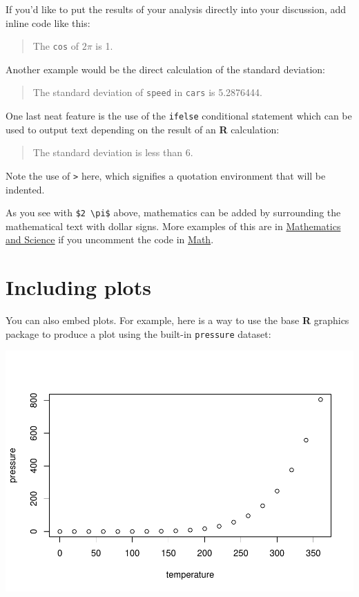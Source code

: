 \documentclass [11pt, proquest] {uwthesis}[2015/03/03]
\begin{document}
If you'd like to put the results of your analysis directly into your discussion, add inline code like this:
\begin{quote}
The \texttt{cos} of \(2 \pi\) is 1.
\end{quote}
Another example would be the direct calculation of the standard deviation:
\begin{quote}
The standard deviation of \texttt{speed} in \texttt{cars} is 5.2876444.
\end{quote}
One last neat feature is the use of the \texttt{ifelse} conditional statement which can be used to output text depending on the result of an \textbf{R} calculation:
\begin{quote}
The standard deviation is less than 6.
\end{quote}
Note the use of \texttt{\textgreater{}} here, which signifies a quotation environment that will be indented.

As you see with \texttt{\$2\ \textbackslash{}pi\$} above, mathematics can be added by surrounding the mathematical text with dollar signs. More examples of this are in \protect\hyperlink{math-sci}{Mathematics and Science} if you uncomment the code in \protect\hyperlink{math}{Math}.

\hypertarget{including-plots}{%
\section{Including plots}\label{including-plots}}

You can also embed plots. For example, here is a way to use the base \textbf{R} graphics package to produce a plot using the built-in \texttt{pressure} dataset:

\includegraphics{thesis_files/figure-latex/pressure-1.pdf}
\end{document}
